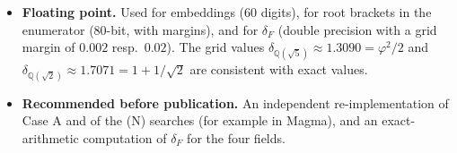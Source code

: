 \documentclass[11pt]{amsart}
\theoremstyle{definition}
\newcommand{\Q}{\mathbb{Q}}
\newcommand{\file}[1]{\texttt{#1}}
\begin{document}
\begin{itemize}[leftmargin=*]
\begin{enumerate}[label=(\alph*)]
    Case A (\file{compare\_split.sh}).  Every polynomial found by only one of the runs is
    reducible, or certified exactly: its forced side has no square root, or the square root
    violates budget--cost.  In total $144$ polynomials were found only by the plain run
    ($137$ reducible, $7$ certified), and $46$ only by the split run (all reducible).  The
    slowest plain runs take up to $52$ minutes; the subtree $(0,-20)$ was split $4$ ways by
    $a_3\bmod 4$ (\texttt{ENUM\_A3MOD}).
  \end{enumerate}
  \textbf{Reproduction.}  \file{run\_degree8.sh} was rerun from scratch in a clean copy of the
  repository.  It reproduces every intermediate count and the final field list exactly (fields,
  discriminants and verdicts of all $390$ Case B fields); for $3$ fields a different subfield
  is named in the RGR2 certificate, as the order of \texttt{nfsubfields} varies.
\item \textbf{Floating point.}  Used for embeddings (60 digits), for root brackets in the
  enumerator (80-bit, with margins), and for $\delta_F$ (double precision with a grid margin
  of $0.002$ resp.\ $0.02$).  The grid values $\delta_{\Q(\sqrt5)}\approx1.3090=\varphi^2/2$ and
  $\delta_{\Q(\sqrt2)}\approx1.7071=1+1/\sqrt2$ are consistent with exact values.
\item \textbf{Recommended before publication.}  An independent re-implementation of Case A
  and of the (N) searches (for example in Magma), and an exact-arithmetic computation of
  $\delta_F$ for the four fields.
\end{itemize}
\end{document}
